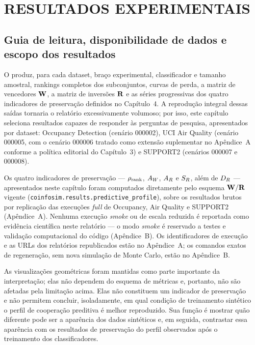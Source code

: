 \chapter{RESULTADOS EXPERIMENTAIS}
\label{chap:resultados}

\section{Guia de leitura, disponibilidade de dados e escopo dos resultados}
\label{sec:resultados-guia}

O \CoInfoSim{} produz, para cada dataset, braço experimental, classificador e tamanho amostral, rankings completos dos subconjuntos, curvas de perda, a matriz de vencedores $\mathbf{W}$, a matriz de inversões $\mathbf{R}$ e as séries progressivas dos quatro indicadores de preservação definidos no Capítulo~4. A reprodução integral dessas saídas tornaria o relatório excessivamente volumoso; por isso, este capítulo seleciona resultados capazes de responder às perguntas de pesquisa, apresentados por dataset: Occupancy Detection (cenário 000002), UCI Air Quality (cenário 000005, com o cenário 000006 tratado como extensão suplementar no Apêndice~A conforme a política editorial do Capítulo~3) e SUPPORT2 (cenários 000007 e 000008).

\begin{limitationbox}
Os quatro indicadores de preservação --- $\rho_{\mathrm{rank}}$, $A_W$, $A_R$ e $S_R$, além de $D_R$ --- apresentados neste capítulo foram computados diretamente pelo esquema $\mathbf{W}/\mathbf{R}$ vigente (\texttt{coinfosim.results.predictive\_profile}), sobre os resultados brutos por replicação das execuções \textit{full} de Occupancy, Air Quality e SUPPORT2 (Apêndice~A). Nenhuma execução \textit{smoke} ou de escala reduzida é reportada como evidência científica neste relatório --- o modo \textit{smoke} é reservado a testes e validação computacional do código (Apêndice~B). Os identificadores de execução e as URLs dos relatórios republicados estão no Apêndice~A; os comandos exatos de regeneração, sem nova simulação de Monte Carlo, estão no Apêndice~B.
\end{limitationbox}

As visualizações geométricas foram mantidas como parte importante da interpretação; elas não dependem do esquema de métricas e, portanto, não são afetadas pela limitação acima. Elas não constituem um indicador de preservação e não permitem concluir, isoladamente, em qual condição de treinamento sintético o perfil de cooperação preditiva é melhor reproduzido. Sua função é mostrar quão diferente pode ser a aparência dos dados sintéticos e, em seguida, contrastar essa aparência com os resultados de preservação do perfil observados após o treinamento dos classificadores.

